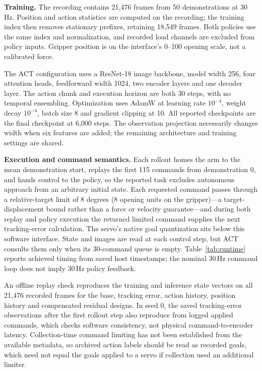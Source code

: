 \documentclass{article}
\begin{document}
\begin{table}[h]
\centering
\small
\caption{Power of the exact two-sided McNemar test with 20 pairs at
$\alpha=0.05$, by the probability that a pair is discordant and the probability
$q$ that a discordant pair favours tracking error. Seed 0's observed structure
(8 discordant pairs, 6 favouring) gives 0.17; seed 1's (15, 14) gives 0.97.}
\label{tab:power}

\end{table}

\textbf{Training.} The recording contains 21,476 frames from 50 demonstrations
at 30\,Hz. Position and action statistics are computed on the recording; the
training index then removes stationary prefixes, retaining 18,549 frames. Both
policies use the same index and normalization, and recorded load channels are
excluded from policy inputs. Gripper position is on the interface's 0--100
opening scale, not a calibrated force.

The ACT configuration uses a ResNet-18 image backbone, model width 256,
four attention heads, feedforward width 1024, two encoder layers and one
decoder layer. The action chunk and execution horizon are both 30 steps,
with no temporal ensembling. Optimization uses AdamW at learning rate
$10^{-4}$, weight decay $10^{-4}$, batch size 8 and gradient clipping at 10.
All reported checkpoints are the final checkpoint at 6,000 steps. The
observation projection necessarily changes width when six features are added;
the remaining architecture and training settings are shared.

\textbf{Execution and command semantics.} Each rollout homes the arm to the
mean demonstration start, replays the first 115 commands from demonstration 0,
and hands control to the policy, so the reported task excludes autonomous
approach from an arbitrary initial state. Each requested command passes through
a relative-target limit of 8 degrees (8 opening units on the gripper)---a
target-displacement bound rather than a force or velocity guarantee---and
during both replay and policy execution the returned limited command supplies
the next tracking-error calculation. The servo's native goal quantization sits
below this software interface. State and images are read at each control step,
but ACT consults them only when its 30-command queue is empty.
Table~\ref{tab:runtime} reports achieved timing from saved host timestamps;
the nominal 30\,Hz command loop does not imply 30\,Hz policy feedback.

An offline replay check reproduces the training and inference state vectors
on all 21,476 recorded frames for the base, tracking error, action history,
position history and compensated residual designs. In seed 0, the saved
tracking-error observations after the first rollout step also reproduce from
logged applied commands, which checks software consistency, not physical
command-to-encoder latency. Collection-time command limiting has not been
established from the available metadata, so archived action labels should be
read as recorded goals, which need not equal the goals applied to a servo if
collection used an additional limiter.
\end{document}
